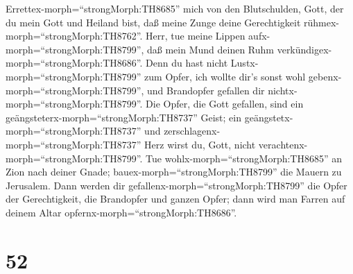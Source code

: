 Errettex-morph=``strongMorph:TH8685'' mich von den Blutschulden, Gott,
der du mein Gott und Heiland bist, daß meine Zunge deine Gerechtigkeit
rühmex-morph=``strongMorph:TH8762''.  Herr, tue meine
Lippen aufx-morph=``strongMorph:TH8799'', daß mein Mund deinen Ruhm
verkündigex-morph=``strongMorph:TH8686''.  Denn du hast
nicht Lustx-morph=``strongMorph:TH8799'' zum Opfer, ich wollte dir's
sonst wohl gebenx-morph=``strongMorph:TH8799'', und Brandopfer gefallen
dir nichtx-morph=``strongMorph:TH8799''.  Die Opfer, die
Gott gefallen, sind ein geängsteterx-morph=``strongMorph:TH8737'' Geist;
ein geängstetx-morph=``strongMorph:TH8737'' und
zerschlagenx-morph=``strongMorph:TH8737'' Herz wirst du, Gott, nicht
verachtenx-morph=``strongMorph:TH8799''.  Tue
wohlx-morph=``strongMorph:TH8685'' an Zion nach deiner Gnade;
bauex-morph=``strongMorph:TH8799'' die Mauern zu Jerusalem.
 Dann werden dir gefallenx-morph=``strongMorph:TH8799'' die
Opfer der Gerechtigkeit, die Brandopfer und ganzen Opfer; dann wird man
Farren auf deinem Altar opfernx-morph=``strongMorph:TH8686''.

\hypertarget{section-51}{%
\section{52}\label{section-51}}

